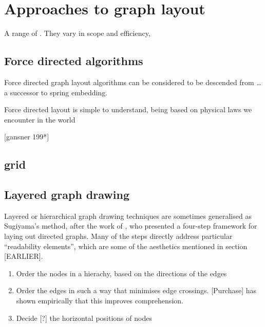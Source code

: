 




\section{Approaches to graph layout}

A range of . They vary in scope and efficiency, 

\subsection{Force directed algorithms}

 Force directed graph layout algorithms can be considered to be descended from   \citet{tutte} \ldots a successor to \citet{tutte} spring embedding.

Force directed layout is simple to understand, being based on physical laws we encounter in the world 


[gansner 199*]

\subsection{grid}




\subsection{Layered graph drawing}

Layered or hierarchical graph drawing techniques are sometimes generalised as Sugiyama's method, after the work of \citet{4308636}, who presented a four-step framework for laying out directed graphs. Many of the steps directly address particular ``readability elements'', which are some of the aesthetics mentioned in section [EARLIER].

\begin{enumerate}
\item Order the nodes in a hierachy, based on the directions of the edges
\item Order the edges in such a way that minimises edge crossings. [Purchase] has shown empirically that this improves comprehension.
\item Decide [?] the horizontal positions of nodes
\end{enumerate}

